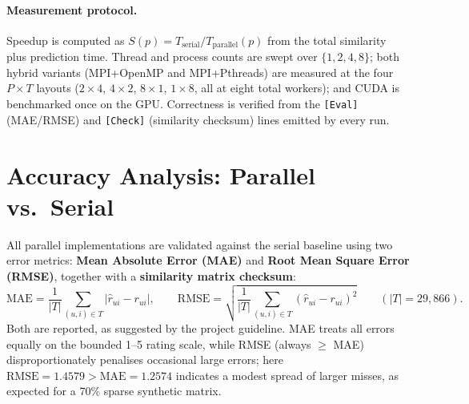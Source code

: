 \documentclass[11pt,a4paper]{article}
\newcommand{\code}[1]{\texttt{\small #1}}
\begin{document}
\paragraph{Measurement protocol.} Speedup is computed as
$S(p) = T_{\text{serial}} / T_{\text{parallel}}(p)$ from the total
similarity plus prediction time. Thread and process counts are swept over
$\{1,2,4,8\}$; both hybrid variants (MPI+OpenMP and MPI+Pthreads) are measured
at the four $P\times T$ layouts ($2\times4$, $4\times2$, $8\times1$,
$1\times8$, all at eight total workers); and CUDA is benchmarked once on the GPU. Correctness is
verified from the \code{[Eval]} (MAE/RMSE) and \code{[Check]} (similarity
checksum) lines emitted by every run.

\section{Accuracy Analysis: Parallel vs.\ Serial}\label{sec:accuracy}

All parallel implementations are validated against the serial baseline using two
error metrics: \textbf{Mean Absolute Error (MAE)} and \textbf{Root Mean Square
Error (RMSE)}, together with a \textbf{similarity matrix checksum}:
\[
  \text{MAE} = \frac{1}{|T|} \sum_{(u,i) \in T} |\hat{r}_{ui} - r_{ui}|,
  \qquad
  \text{RMSE} = \sqrt{\frac{1}{|T|} \sum_{(u,i) \in T} (\hat{r}_{ui} - r_{ui})^2}
  \qquad (|T| = 29{,}866).
\]
Both are reported, as suggested by the project guideline. MAE treats all errors
equally on the bounded 1--5 rating scale, while RMSE (always $\ge$ MAE)
disproportionately penalises occasional large errors; here
$\text{RMSE}=1.4579 > \text{MAE}=1.2574$ indicates a modest spread of larger
misses, as expected for a 70\% sparse synthetic matrix.
\end{document}
